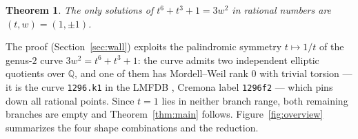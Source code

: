 \documentclass[11pt]{article}
\newtheorem{theorem}{Theorem}
\theoremstyle{remark}
\newcommand{\Q}{\mathbb{Q}}
\begin{document}
\begin{theorem}\label{thm:wall}
The only solutions of $t^6+t^3+1=3w^2$ in rational numbers are $(t,w)=(1,\pm 1)$.
\end{theorem}

The proof (Section~\ref{sec:wall}) exploits the palindromic symmetry $t\mapsto 1/t$ of the genus-$2$ curve $3w^2=t^6+t^3+1$: the curve admits two independent elliptic quotients over $\Q$, and one of them has Mordell--Weil rank $0$ with trivial torsion --- it is the curve \texttt{1296.k1} in the LMFDB \cite{LMFDB}, Cremona label \texttt{1296f2} --- which pins down all rational points. Since $t=1$ lies in neither branch range, both remaining branches are empty and Theorem~\ref{thm:main} follows. Figure~\ref{fig:overview} summarizes the four shape combinations and the reduction.
\end{document}
